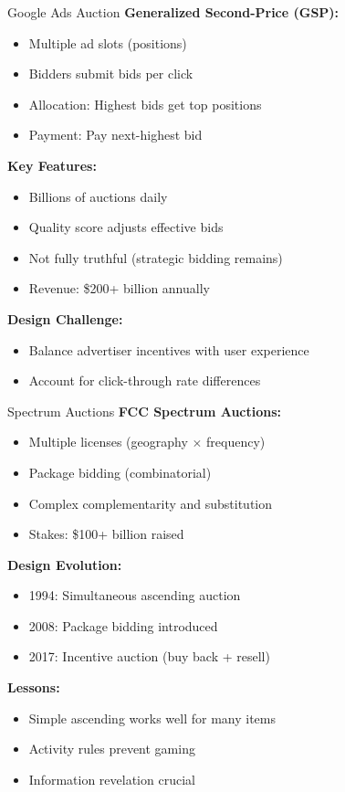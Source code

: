 \documentclass[xcolor={x11names}, aspectratio=169 ]{beamer}
\begin{document}
\begin{frame}{Google Ads Auction}
\textbf{Generalized Second-Price (GSP):}
\begin{itemize}
  \item Multiple ad slots (positions)
  \item Bidders submit bids per click
  \item Allocation: Highest bids get top positions
  \item Payment: Pay next-highest bid
\end{itemize}

\textbf{Key Features:}
\begin{itemize}
  \item Billions of auctions daily
  \item Quality score adjusts effective bids
  \item Not fully truthful (strategic bidding remains)
  \item Revenue: \$200+ billion annually
\end{itemize}

\textbf{Design Challenge:}
\begin{itemize}
  \item Balance advertiser incentives with user experience
  \item Account for click-through rate differences
\end{itemize}
\end{frame}

\begin{frame}{Spectrum Auctions}
\textbf{FCC Spectrum Auctions:}
\begin{itemize}
  \item Multiple licenses (geography $\times$ frequency)
  \item Package bidding (combinatorial)
  \item Complex complementarity and substitution
  \item Stakes: \$100+ billion raised
\end{itemize}

\textbf{Design Evolution:}
\begin{itemize}
  \item 1994: Simultaneous ascending auction
  \item 2008: Package bidding introduced
  \item 2017: Incentive auction (buy back + resell)
\end{itemize}

\textbf{Lessons:}
\begin{itemize}
  \item Simple ascending works well for many items
  \item Activity rules prevent gaming
  \item Information revelation crucial
\end{itemize}
\end{frame}
\end{document}
